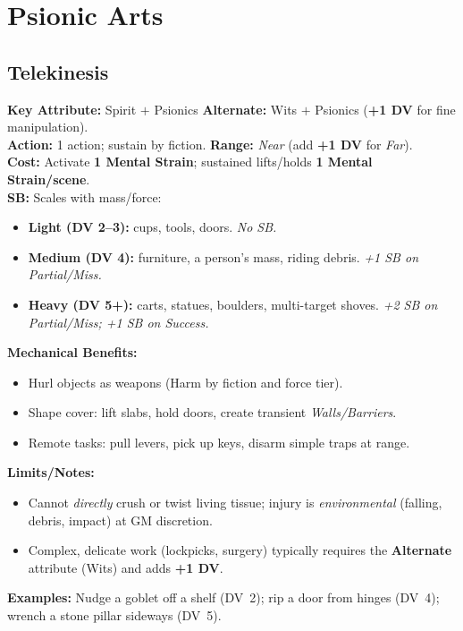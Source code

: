 \documentclass[11pt,twoside]{article}
\begin{document}
\section{Psionic Arts}

\subsection{Telekinesis}
\textbf{Key Attribute:} Spirit $+$ Psionics \quad
\textbf{Alternate:} Wits $+$ Psionics (\textbf{+1 DV} for fine manipulation). \\
\textbf{Action:} 1 action; sustain by fiction. \quad
\textbf{Range:} \textit{Near} (add \textbf{+1 DV} for \textit{Far}). \\
\textbf{Cost:} Activate \textbf{1 Mental Strain}; sustained lifts/holds \textbf{1 Mental Strain/scene}. \\
\textbf{SB:} Scales with mass/force:
\begin{itemize}[leftmargin=*]
  \item \textbf{Light (DV 2--3):} cups, tools, doors. \emph{No SB.}
  \item \textbf{Medium (DV 4):} furniture, a person's mass, riding debris. \emph{+1 SB on Partial/Miss.}
  \item \textbf{Heavy (DV 5+):} carts, statues, boulders, multi-target shoves. \emph{+2 SB on Partial/Miss; +1 SB on Success.}
\end{itemize}
\textbf{Mechanical Benefits:}
\begin{itemize}[leftmargin=*]
  \item Hurl objects as weapons (Harm by fiction and force tier).
  \item Shape cover: lift slabs, hold doors, create transient \emph{Walls/Barriers}.
  \item Remote tasks: pull levers, pick up keys, disarm simple traps at range.
\end{itemize}
\textbf{Limits/Notes:}
\begin{itemize}[leftmargin=*]
  \item Cannot \emph{directly} crush or twist living tissue; injury is \emph{environmental} (falling, debris, impact) at GM discretion.
  \item Complex, delicate work (lockpicks, surgery) typically requires the \textbf{Alternate} attribute (Wits) and adds \textbf{+1 DV}.
\end{itemize}
\textbf{Examples:} Nudge a goblet off a shelf (DV~2); rip a door from hinges (DV~4); wrench a stone pillar sideways (DV~5).
\end{document}
